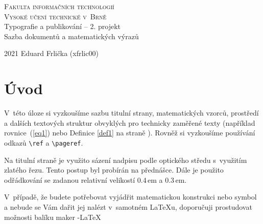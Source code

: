 \documentclass[twocolumn,11pt]{article}
\theoremstyle{definition}
\begin{document}
\begin{titlepage}
\begin{center}
{\Huge
\textsc{Fakulta informačních technologií \\ Vysoké učení technické v~Brně} \\}
{\LARGE 
{}Typografie a publikování – 2. projekt \\ Sazba dokumentů a matematických výrazů \\}
\end{center}
{\Large 2021 \hfill Eduard Frlička (xfrlic00)}
\end{titlepage}

\section*{Úvod}

V~této úloze si vyzkoušíme sazbu titulní strany, matematických vzorců, prostředí a dalších textových struktur obvyklých pro technicky zaměřené texty (například rovnice~(\ref{eq1}) nebo Definice \ref{def1} na straně \pageref{def1}). Rovněž si vyzkoušíme používání odkazů \verb|\ref| a \verb|\pageref|.

Na titulní straně je využito sázení nadpisu podle optického středu s~využitím zlatého řezu. Tento postup byl probírán na přednášce. Dále je použito odřádkování se zadanou relativní velikostí 0.4\,em a 0.3\,em.

V~případě, že budete potřebovat vyjádřit matematickou konstrukci nebo symbol a nebude se Vám dařit jej nalézt v~samotném \LaTeX u, doporučuji prostudovat možnosti balíku maker \AmS-\LaTeX
\end{document}
